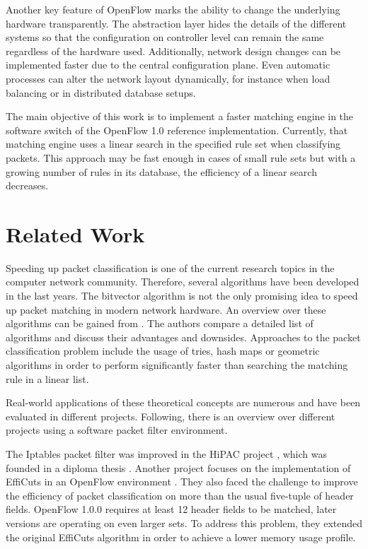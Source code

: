 \documentclass[a4paper,
		12pt,
		parskip=full,
		titlepage
		]{scrartcl}
\begin{document}
Another key feature of OpenFlow marks the ability to change the underlying hardware transparently.
The abstraction layer hides the details of the different systems so that 
the configuration on controller level can remain the same regardless of the hardware used.
Additionally, network design changes can be implemented faster due to the central configuration plane.
Even automatic processes can alter the network layout dynamically, for instance when load balancing 
or in distributed database setups.

The main objective of this work is to implement a faster matching engine in the software switch of the OpenFlow 1.0 reference implementation.
Currently, that matching engine uses a linear search in the specified rule set when classifying packets.
This approach may be fast enough in cases of small rule sets but with a growing number of rules in its database, the efficiency of a linear search decreases.

\section{Related Work}
Speeding up packet classification is one of the current research topics in the computer network community.
Therefore, several algorithms have been developed in the last years.
The bitvector algorithm is not the only promising idea to speed up packet matching in modern network hardware.
An overview over these algorithms can be gained from \cite{algorithms_survey}.
The authors compare a detailed list of algorithms and discuss their advantages and downsides.
Approaches to the packet classification problem include the usage of tries, 
hash maps or geometric algorithms\cite{hicuts} in order to perform significantly 
faster than searching the matching rule in a linear list.

Real-world applications of these theoretical concepts are numerous and have been evaluated in different projects.
Following, there is an overview over different projects using a software packet filter environment.

The Iptables\cite{iptables} packet filter was improved in the HiPAC project \cite{hipac}, which was founded in a diploma thesis \cite{heinzhigh}.
Another project focuses on the implementation of EffiCuts in an OpenFlow environment \cite{stimpfling2013optimal}.
They also faced the challenge to improve the efficiency of packet classification on more than the usual five-tuple of header fields.
OpenFlow 1.0.0 \cite{openflow_spec10} requires at least 12 header fields to be matched, later versions are operating on even larger sets.
To address this problem, they extended the original EffiCuts algorithm in order to achieve a lower memory usage profile.
\end{document}
